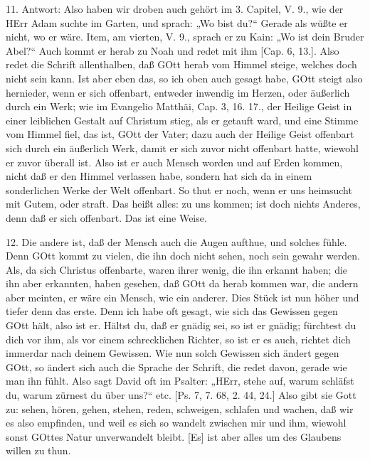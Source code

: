 11. Antwort: Also haben wir droben auch gehört im 3. Capitel, V. 9., wie der HErr Adam suchte im Garten, und sprach: „Wo bist du?“ Gerade als wüßte er nicht, wo er wäre. Item, am vierten, V. 9., sprach er zu Kain: „Wo ist dein Bruder Abel?“ Auch kommt er herab zu Noah und redet mit ihm [Cap. 6, 13.]. Also redet die Schrift allenthalben, daß GOtt herab vom Himmel steige, welches doch nicht sein kann. Ist aber eben das, so ich oben auch gesagt habe, GOtt steigt also hernieder, wenn er sich offenbart, entweder inwendig im Herzen, oder äußerlich durch ein Werk; wie im Evangelio Matthäi, Cap. 3, 16. 17., der Heilige Geist in einer leiblichen Gestalt auf Christum stieg, als er getauft ward, und eine Stimme vom Himmel fiel, das ist, GOtt der Vater; dazu auch der Heilige Geist offenbart sich durch ein äußerlich Werk, damit er sich zuvor nicht offenbart hatte, wiewohl er zuvor überall ist. Also ist er auch Mensch worden und auf Erden kommen, nicht daß er den Himmel verlassen habe, sondern hat sich da in einem sonderlichen Werke der Welt offenbart. So thut er noch, wenn er uns heimsucht mit Gutem, oder straft. Das heißt alles: zu uns kommen; ist doch nichts Anderes, denn daß er sich offenbart. Das ist eine Weise.

12. Die andere ist, daß der Mensch auch die Augen aufthue, und solches fühle. Denn GOtt kommt zu vielen, die ihn doch nicht sehen, noch sein gewahr werden. Als, da sich Christus offenbarte, waren ihrer wenig, die ihn erkannt haben; die ihn aber erkannten, haben gesehen, daß GOtt da herab kommen war, die andern aber meinten, er wäre ein Mensch, wie ein anderer. Dies Stück ist nun höher und tiefer denn das erste. Denn ich habe oft gesagt, wie sich das Gewissen gegen GOtt hält, also ist er. Hältst du, daß er gnädig sei, so ist er gnädig; fürchtest du dich vor ihm, als vor einem schrecklichen Richter, so ist er es auch, richtet dich immerdar nach deinem Gewissen. Wie nun solch Gewissen sich ändert gegen GOtt, so ändert sich auch die Sprache der Schrift, die redet davon, gerade wie man ihn fühlt. Also sagt David oft im Psalter: „HErr, stehe auf, warum schläfst du, warum zürnest du über uns?“ etc. [Ps. 7, 7. 68, 2. 44, 24.] Also gibt sie Gott zu: sehen, hören, gehen, stehen, reden, schweigen, schlafen und wachen, daß wir es also empfinden, und weil es sich so wandelt zwischen mir und ihm, wiewohl sonst GOttes Natur unverwandelt bleibt. [Es] ist aber alles um des Glaubens willen zu thun.

